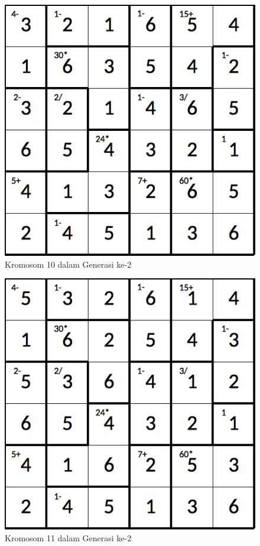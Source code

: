 \begin{figure}
\centering
\captionsetup{justification=centering}
\includegraphics[scale=0.333]{Gambar/hybridgenetic/Generation2Chromosome10}
\caption[Kromosom 10 dalam Generasi ke-2]{Kromosom 10 dalam Generasi ke-2}
\label{fig:analisisg2k10}
\end{figure}

\begin{figure}
\centering
\captionsetup{justification=centering}
\includegraphics[scale=0.333]{Gambar/hybridgenetic/Generation2Chromosome11}
\caption[Kromosom 11 dalam Generasi ke-2]{Kromosom 11 dalam Generasi ke-2}
\label{fig:analisisg2k11}
\end{figure}

